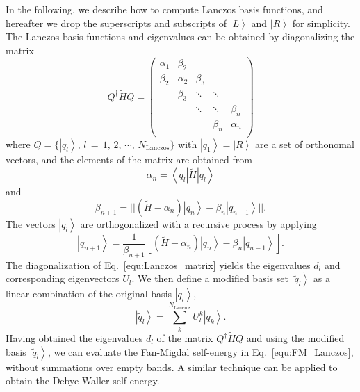 \documentclass[journal=jctc,manuscript=article,preprint]{achemso}
\begin{document}
In the following, we describe how to compute Lanczos basis functions, and hereafter we drop the superscripts and subscripts of $\left|L\right\rangle$ and $\left|R\right\rangle$ for simplicity. The Lanczos basis functions and eigenvalues can be obtained by diagonalizing the matrix
\begin{equation}
    Q^\dagger\tilde{H}Q = \left(
    \begin{matrix}
    \alpha_1 &  \beta_2 &          &         &          \\
    \beta_2  & \alpha_2 &  \beta_3 &         &          \\
             & \beta_3  & \ddots   & \ddots  &          \\
             &          & \ddots   & \ddots  & \beta_n  \\
             &          &          & \beta_n & \alpha_n \\
    \end{matrix}
    \right)
    \label{equ:Lanczos_matrix}
\end{equation}
where $Q = \{\left|q_l\right\rangle,\,l\,=\,1,\,2,\,\cdots,\,N_\mathrm{Lanczos}\}$ with $\left|q_1\right\rangle = \left|R\right\rangle$ are a set of orthonomal vectors, and the elements of the matrix are obtained from
\begin{equation}
    \alpha_n = \left\langle q_l \left| \tilde{H} \right| q_l\right\rangle
\end{equation}
and
\begin{equation}
    \beta_{n+1} = ||(\tilde{H}-\alpha_n)\left|q_n\right\rangle-\beta_n\left|q_{n-1}\right\rangle|| .
\end{equation}
The vectors  $\left|q_l \right\rangle$ are orthogonalized  with a recursive process by applying
\begin{equation}
    \left|q_{n+1}\right\rangle = \frac{1}{\beta_{n+1}}\left[(\tilde{H}-\alpha_n)\left|q_n\right\rangle-\beta_n\left|q_{n-1}\right\rangle\right].
\end{equation}
The diagonalization of Eq.~\ref{equ:Lanczos_matrix} yields the eigenvalues $d_l$ and corresponding eigenvectors $U_l$. We then define a modified basis set $\left| \tilde{q}_l \right\rangle$ as a linear combination of the original basis $\left| q_l \right\rangle$,
\begin{equation}
    \left| \tilde{q}_l \right\rangle  = \sum_{k}^{N_\mathrm{Lanczos}} U_l^k\left|q_k \right\rangle.
\end{equation}
Having obtained the eigenvalues $d_l$ of the matrix $Q^\dagger\tilde{H}Q$ and using the modified basis $\left| \tilde{q}_l \right\rangle$, we can evaluate the Fan-Migdal self-energy in Eq.~\ref{equ:FM_Lanczos}, without summations over empty bands. A similar technique can  be applied to obtain the Debye-Waller self-energy.
\end{document}
